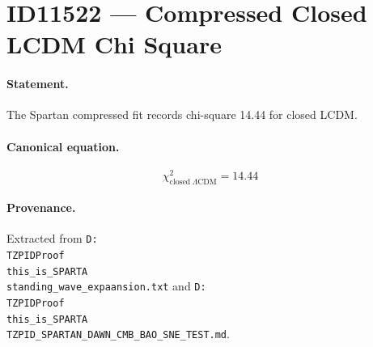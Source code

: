 \section*{ID11522 --- Compressed Closed LCDM Chi Square}

\paragraph{Statement.}
The Spartan compressed fit records chi-square 14.44 for closed LCDM.

\paragraph{Canonical equation.}
\[
\chi^2_{\mathrm{closed\ }\Lambda\mathrm{CDM}}=14.44
\]

\paragraph{Provenance.}
Extracted from \texttt{D:\\TZPIDProof\\this\_is\_SPARTA\\standing\_wave\_expaansion.txt} and \texttt{D:\\TZPIDProof\\this\_is\_SPARTA\\TZPID\_SPARTAN\_DAWN\_CMB\_BAO\_SNE\_TEST.md}.

